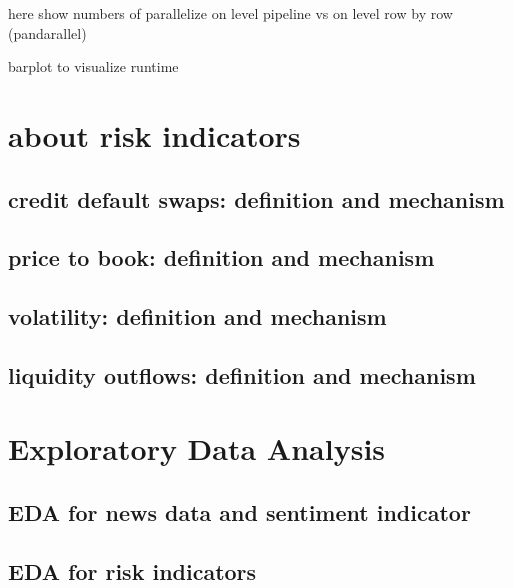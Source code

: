 here show numbers of parallelize on level pipeline vs on level row by row (pandarallel)

barplot to visualize runtime

\section{about risk indicators}

\subsection{credit default swaps: definition and mechanism}

\subsection{price to book: definition and mechanism}

\subsection{volatility: definition and mechanism}

\subsection{liquidity outflows: definition and mechanism}

\section{Exploratory Data Analysis}

\subsection{EDA for news data and sentiment indicator}

\subsection{EDA for risk indicators}

\cleardoublepage
